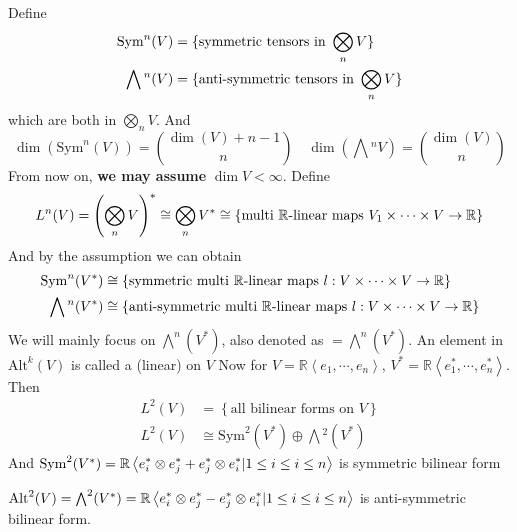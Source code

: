 Define 
\begin{equation}
    \begin{aligned}
        \name{$ \mathrm{Sym}^n(V) $}&=\{\text{symmetric tensors in }\bigotimes_n V\}\\
        \name{$ \bigwedge{}^n(V) $}&=\{\text{anti-symmetric tensors in }\bigotimes_n V\}
    \end{aligned}
\end{equation}
which are both in  $ \bigotimes\limits_nV $. And
\begin{equation}
    \dim (\mathrm{Sym}^n(V))=\binom{\dim(V)+n-1}{n}\quad\dim(\bigwedge{}^n  V)=\binom{\dim(V)}{n}
\end{equation}
From now on, \textbf{we may assume}  $ \dim V<\infty $. Define 
\begin{equation}
    \name{$ L^n(V) $}=\left(\bigotimes\limits_n V\right)^*\cong \bigotimes_n V^*\cong \left\{\text{multi  $ \mathbb{R} $-linear maps }V_1\times \cdots\times V\rightarrow \mathbb{R}\right\}
\end{equation} 
And by the assumption we can obtain
\begin{equation}
    \begin{aligned}
        \mathrm{Sym}^n(V^*)&\cong\{\text{symmetric multi  $ \mathbb{R} $-linear maps }l:V\times \cdots \times V\rightarrow \mathbb{R}\}\\
        \bigwedge{}^n(V^*)&\cong \{\text{anti-symmetric multi  $ \mathbb{R} $-linear maps }l:V\times \cdots \times V\rightarrow \mathbb{R}\}
    \end{aligned}
\end{equation}
We will mainly focus on $\bigwedge^n(V^*)$, also denoted as $=\bigwedge^n(V^*)  $.  
An element in  $ \mathrm{Alt}^k(V) $ is called a (linear)  on  $ V $ 
Now for  $ V=\mathbb{R}\left<e_1,\cdots,e_n\right> $,  $ V^*=\mathbb{R}\left<e_1^*,\cdots,e_n^*\right> $. Then 
\begin{align*}
    L^2(V)&=\left\{\text{all bilinear forms on }V\right\}\\  
    L^2(V)&\cong \mathrm{Sym}^2(V^*)\oplus \bigwedge{}^2(V^*)
\end{align*}
And  $ \mathrm{Sym}^2(V^*)=\displaystyle\mathbb{R}\left<e_i^*\otimes e_j^*+e_j^*\otimes e_i^*|1 \leq i \leq i \leq n \right> $ is symmetric bilinear form

$ \mathrm{Alt}^2(V)=\bigwedge^2(V^*)=\displaystyle\mathbb{R}\left<e_i^*\otimes e_j^*-e_j^*\otimes e_i^*|1 \leq i \leq i \leq n \right> $ is anti-symmetric bilinear form.

